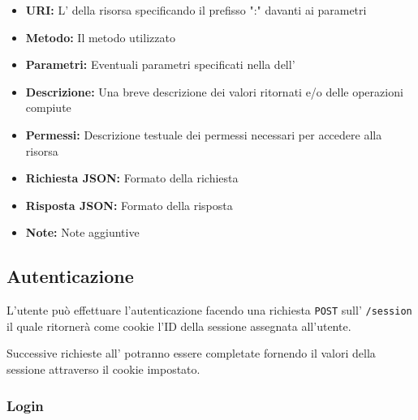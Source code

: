         \begin{itemize}
            \item \textbf{URI:} L' della risorsa specificando il prefisso
                ":" davanti ai parametri
            \item \textbf{Metodo:} Il metodo  utilizzato
            \item \textbf{Parametri:} Eventuali parametri specificati nella 
                dell'
            \item \textbf{Descrizione:} Una breve descrizione dei valori ritornati e/o delle
                operazioni compiute
            \item \textbf{Permessi:} Descrizione testuale dei permessi necessari
                per accedere alla risorsa
            \item \textbf{Richiesta JSON:} Formato della richiesta 
            \item \textbf{Risposta JSON:} Formato della risposta 
            \item \textbf{Note:} Note aggiuntive
        \end{itemize}

\subsection{Autenticazione}

	L'utente può effettuare l'autenticazione facendo una richiesta \texttt{POST} sull' \texttt{/session} il quale ritornerà come cookie l'ID della sessione assegnata all'utente.
	
	Successive richieste all' potranno essere completate fornendo il valori della sessione attraverso il cookie impostato.

    \subsubsection{Login}

